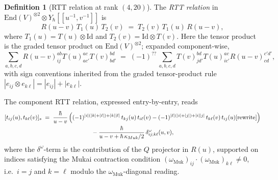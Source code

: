 \documentclass{article}
\providecommand{\End}{\mathrm{End}}
\providecommand{\Id}{\mathrm{Id}}
\theoremstyle{definition}
\newtheorem{definition}[theorem]{Definition}
\begin{document}
\begin{definition}[RTT relation at rank $(4, 20)$]
\label{def:r10-RTT}
The \emph{RTT relation} in $\End(V)^{\otimes 2} \otimes Y_\hbar[[u^{-1},
v^{-1}]]$ is
\begin{equation}\label{eq:r10-RTT}
  R(u - v)\, T_1(u)\, T_2(v)
  \;=\;
  T_2(v)\, T_1(u)\, R(u - v),
\end{equation}
where $T_1(u) = T(u) \otimes \Id$ and $T_2(v) = \Id \otimes T(v)$.
Here the tensor product is the graded tensor product on
$\End(V)^{\otimes 2}$; expanded component-wise,
\begin{equation}\label{eq:r10-RTT-components}
  \sum_{a, b, c, d} R(u-v)^{ab}_{ij} T(u)^{ac}_{ac'} T(v)^{bd}_{bd'}
  \;=\;
  (-1)^{??}\, \sum_{a, b, c, d} T(v)^{bd}_{jd'} T(u)^{ac}_{ic'}
  R(u-v)^{c'd'}_{cd},
\end{equation}
with sign conventions inherited from the graded tensor-product rule
$|e_{ij} \otimes e_{k\ell}| = |e_{ij}| + |e_{k\ell}|$.
\end{definition}

The component RTT relation, expressed entry-by-entry, reads
\begin{multline}\label{eq:r10-RTT-explicit-components}
  [t_{ij}(u), t_{k\ell}(v)]_s
  \;=\;
  \frac{\hbar}{u - v}\, \Bigl(
    (-1)^{|i|(|k|+|\ell|) + |k||\ell|}\, t_{kj}(u)\, t_{i\ell}(v)
    - (-1)^{|\ell|(|i|+|j|) + |i||j|}\, t_{k\ell}(v)\, t_{ij}(u)
    \text{[rewrite]}
  \Bigr) \\
  {} - \frac{\hbar}{u - v + \hbar\,\kappa_{\mathrm{Muk}}/2}\,
  \delta^{\omega}_{ij; k\ell}(u, v),
\end{multline}
where the $\delta^{\omega}$-term is the contribution of the $Q$
projector in $R(u)$, supported on indices satisfying the Mukai
contraction condition
$(\omega_{\mathrm{Muk}})_{ij} \cdot (\omega_{\mathrm{Muk}})_{k\ell}
\neq 0$, i.e.\ $i = j$ and $k = \ell$ modulo the
$\omega_{\mathrm{Muk}}$-diagonal reading.
\end{document}
